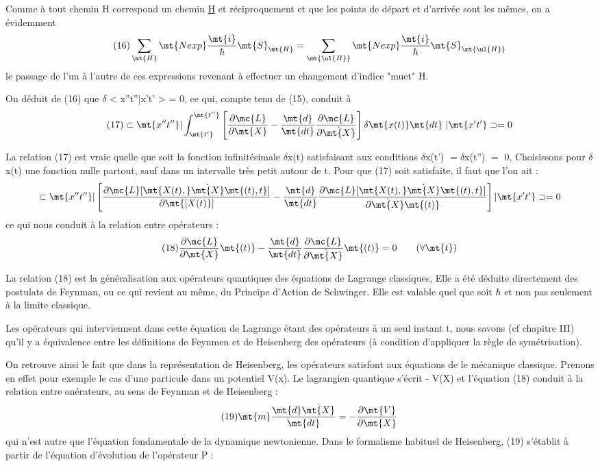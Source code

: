 Comme à tout chemin H correspond un chemin \ul{H} et réciproquement
et que les points de départ et d'arrivée sont les mêmes, on a évidemment
\[
\tag{16}\sum_\mt{H}\mt{N exp}\frac{\mt{i}}{\hbar}\mt{S}_\mt{H}=
\sum_\mt{\ul{H}}\mt{N exp}\frac{\mt{i}}{\hbar}\mt{S}_\mt{\ul{H}}
\]
le passage de l'un à l'autre de ces expressions revenant à effectuer un
changement d'indice "muet" H.

On déduit de (16) que $\delta$ < x''t''|x't' > = 0, ce qui, compte tenu
de (15), conduit à
\[
\tag{17}\subset \mt{x''t'' }|
\int^\mt{t''}_\mt{t'}
\left[\frac{\partial\mc{L}}{\partial\mt{X}}
-\frac{\mt{d}}{\mt{dt}}\frac{\partial\mc{L}}{\partial\dot{\mt{X}}}\right]
\delta\mt{x(t) }\mt{dt}\ |\mt{ x't'}\supset=0
\]

La relation (17) est vraie quelle que soit la fonction infinitésimale $\delta$x(t)
satisfaisant aux conditions $\delta$x(t') $= \delta$x(t'') $=$ 0,
Choisissons pour $\delta$x(t) une fonction nulle partout, sauf dans un intervalle
très petit autour de t. Pour que (17) soit satisfaite, il faut que l'on ait :
\[
\subset \mt{x''t'' }|
\left[\frac{\partial\mc{L}[\mt{X(t), }\dot{\mt{X}}\mt{(t), t}]}{\partial\mt{[X(t)}]}
-\frac{\mt{d}}{\mt{dt}}\frac{\partial\mc{L}[\mt{X(t), }\dot{\mt{X}}\mt{(t), t}]}{\partial\dot{\mt{X}}\mt{(t)}}\right]
|\mt{ x't'}\supset=0
\]
ce qui nous conduit à la relation entre opérateurs :
\[
\tag{18}\frac{\partial\mc{L}}{\partial\mt{X}}\mt{(t)}
-\frac{\mt{d}}{\mt{dt}}\frac{\partial\mc{L}}{\partial\dot{\mt{X}}}\mt{(t)}=0\ \ \ \ \ \ (\forall\mt{t})
\]

La relation (18) est la généralisation aux opérateurs quantiques
des équations de Lagrange classiques, Elle a été déduite directement des
postulats de Feynman, ou ce qui revient au même, du Principe d'Action de
Schwinger. Elle est valable quel que soit $\hbar$ et non pas seulement à la
limite classique.

Les opérateurs qui interviennent dans cette équation de Lagrange
étant des opérateurs à un seul instant t, nous savons (cf chapitre III)
qu'il y a équivalence entre les définitions de Feynmen et de Heisenberg
des opérateurs (à condition d'appliquer la règle de symétrisation).

On retrouve ainsi le fait que dans la représentation de Heisenberg,
les opérateurs satisfont aux équations de le mécanique classique. Prenons en
effet pour exemple le cas d'une particule dans un potentiel V(x). Le lagrangien quantique s'écrit  - V(X) et l'équation (18) conduit à la relation entre onérateurs, au sens de Feynman et de Heisenberg :
\[
\tag{19}\mt{m}\frac{\mt{d}\dot{\mt{X}}}{\mt{dt}}=
-\frac{\partial\mt{V}}{\partial\mt{X}}
\]
qui n'est autre que l'équation fondamentale de la dynamique newtonienne.
Dans le formalisme habituel de Heisenberg, (19) s'établit à partir de
l'équation d'évolution de l'opérateur P :

